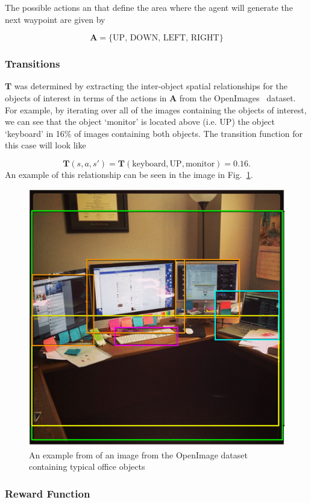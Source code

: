 \documentclass[runningheads]{llncs}
\begin{document}
The possible actions an that define the area where the agent will generate the next waypoint are given by

\begin{equation}
  \mathbf{A} = \{ \textrm{UP, DOWN, LEFT, RIGHT} \}
\end{equation}

\subsubsection{Transitions}

$\mathbf{T}$ was determined by extracting the inter-object spatial relationships for the objects of interest in terms of the actions in $\mathbf{A}$ from the OpenImages~\cite{openimages} dataset. 
For example, by iterating over all of the images containing the objects of interest, we can see that the object `monitor' is located above (i.e. UP) the object `keyboard' in 16\% of images containing both objects. 
The transition function for this case will look like 

\begin{equation}
  \mathbf{T}(s, a, s') = \mathbf{T}(\textrm{keyboard}, \textrm{UP}, \textrm{monitor}) = 0.16.
\end{equation}
An example of this relationship can be seen in the image in Fig.~\ref{fig:openimage}.

\begin{figure}
  \centering
  \includegraphics[width=0.5\columnwidth]{figures/desk_example.png}
  \caption{An example from of an image from the OpenImage dataset~\cite{openimages} containing typical office objects}\label{fig:openimage}
\end{figure}

\subsubsection{Reward Function}
\end{document}
